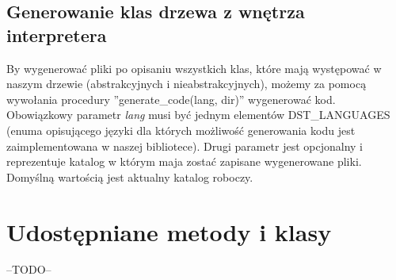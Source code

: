 \documentclass{article}
\begin{document}
\subsection{Generowanie klas drzewa z wnętrza interpretera}
By wygenerować pliki po opisaniu wszystkich klas, które mają występować w naszym drzewie (abstrakcyjnych i nieabstrakcyjnych),
możemy za pomocą wywołania procedury ''generate\_code(lang, dir)'' wygenerować kod. Obowiązkowy parametr \emph{lang}
musi być jednym elementów DST\_LANGUAGES (enuma opisującego języki dla których możliwość generowania kodu jest zaimplementowana w naszej
 bibliotece). Drugi parametr jest opcjonalny i reprezentuje katalog w którym maja zostać zapisane wygenerowane pliki. Domyślną wartością jest aktualny
 katalog roboczy.

\section{Udostępniane metody i klasy}
--TODO--
\end{document}
